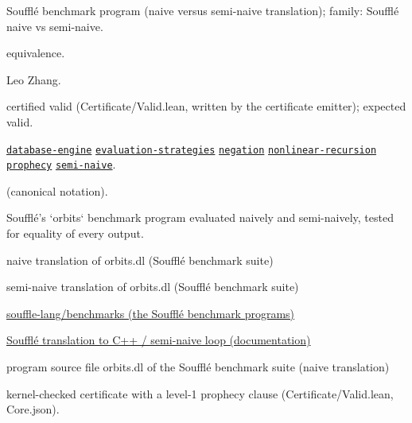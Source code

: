 \documentclass[10pt]{article}
\begin{document}
\begin{description}[leftmargin=2.6cm,style=nextline,itemsep=1pt]

\item[Category] Soufflé benchmark program (naive versus semi-naive translation); family: Soufflé naive vs semi-naive.

\item[Kind] equivalence.

\item[Contributors] Leo Zhang.

\item[Status] certified valid (Certificate/Valid.lean, written by the certificate emitter); expected valid.

\item[Tags] \hyperref[tag:database-engine]{\texttt{database-engine}} \hyperref[tag:evaluation-strategies]{\texttt{evaluation-strategies}} \hyperref[tag:negation]{\texttt{negation}} \hyperref[tag:nonlinear-recursion]{\texttt{nonlinear-recursion}} \hyperref[tag:prophecy]{\texttt{prophecy}} \hyperref[tag:semi-naive]{\texttt{semi-naive}}.

\item[Input]  (canonical notation).

\item[Summary] Soufflé's `orbits` benchmark program evaluated naively and semi-naively, tested for equality of every output.

\item[Sides] naive translation of orbits.dl (Soufflé benchmark suite) \par semi-naive translation of orbits.dl (Soufflé benchmark suite)

\item[Sources] {\raggedright \href{https://github.com/souffle-lang/benchmarks}{souffle-lang/benchmarks (the Soufflé benchmark programs)} \par \href{https://souffle-lang.github.io/translate}{Soufflé translation to C++ / semi-naive loop (documentation)} \par program source file orbits.dl of the Soufflé benchmark suite (naive translation)\par}

\item[Prophecy] kernel-checked certificate with a level-1 prophecy clause (Certificate/Valid.lean, Core.json).

\end{description}
\end{document}
